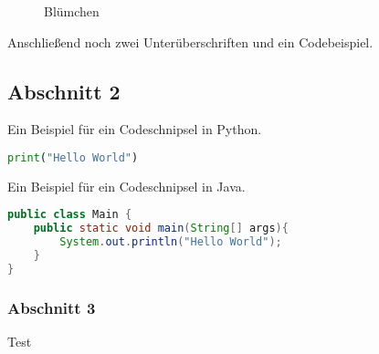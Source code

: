 \begin{figure}[h!]
	\caption{Blümchen \citep{Norman:2002}}
	\label{img:norman2010}
\end{figure}

Anschließend noch zwei Unterüberschriften und ein Codebeispiel.

\subsection{Abschnitt 2}\label{section:2}
Ein Beispiel für ein Codeschnipsel in Python.\\

\begin{lstlisting}[captionpos=b, belowcaptionskip=4pt, caption=Hello World (Python), label=helloworld, language=Python]
print("Hello World")
\end{lstlisting}

Ein Beispiel für ein Codeschnipsel in Java.\\

\begin{lstlisting}[captionpos=b, belowcaptionskip=4pt, caption=Hello World (Java), language=Java]
public class Main {
	public static void main(String[] args){
		System.out.println("Hello World");	
	}    
}
\end{lstlisting}


\subsubsection{Abschnitt 3}
Test

\newpage



